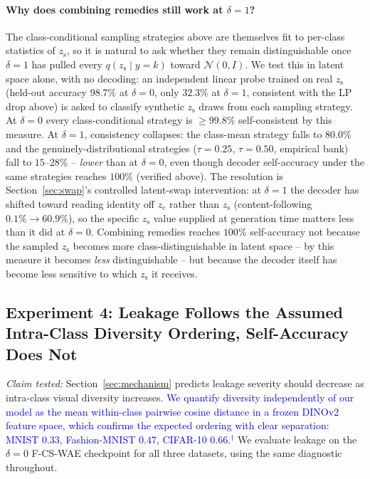 \documentclass[10pt,letterpaper]{article}
\newcommand{\ours}{F-CS-WAE}
\newcommand{\zc}{z_{\mathrm{c}}}
\newcommand{\zs}{z_{\mathrm{s}}}
\newcommand{\pj}[1]{\textcolor{blue}{#1$^{\dagger}$}}
\begin{document}
\paragraph{Why does combining remedies still work at $\delta{=}1$?} The
class-conditional sampling strategies above are themselves fit to per-class
statistics of $\zs$, so it is natural to ask whether they remain
distinguishable once $\delta{=}1$ has pulled every $q(\zs\mid y{=}k)$ toward
$\mathcal N(0,I)$. We test this in latent space alone, with no decoding: an
independent linear probe trained on real $\zs$ (held-out accuracy $98.7\%$
at $\delta{=}0$, only $32.3\%$ at $\delta{=}1$, consistent with the LP drop
above) is asked to classify synthetic $\zs$ draws from each sampling
strategy. At $\delta{=}0$ every class-conditional strategy is $\geq99.8\%$
self-consistent by this measure. At $\delta{=}1$, consistency collapses:
the class-mean strategy falls to $80.0\%$ and the genuinely-distributional
strategies ($\tau{=}0.25$, $\tau{=}0.50$, empirical bank) fall to
$15$--$28\%$ -- \emph{lower} than at $\delta{=}0$, even though decoder
self-accuracy under the same strategies reaches $100\%$ (verified above).
The resolution is Section~\ref{sec:swap}'s controlled latent-swap intervention: at
$\delta{=}1$ the decoder has shifted toward reading identity off $\zc$
rather than $\zs$ (content-following $0.1\%\to60.9\%$), so the specific
$\zs$ value supplied at generation time matters less than it did at
$\delta{=}0$. Combining remedies reaches $100\%$ self-accuracy not because
the sampled $\zs$ becomes more class-distinguishable in latent space -- by
this measure it becomes \emph{less} distinguishable -- but because the
decoder itself has become less sensitive to which $\zs$ it receives.

\subsection{Experiment 4: Leakage Follows the Assumed Intra-Class Diversity Ordering, Self-Accuracy Does Not}
\label{sec:exp4}
\label{sec:cross-dataset}

\emph{Claim tested:} Section~\ref{sec:mechanism} predicts leakage severity
should decrease as intra-class visual diversity increases. \pj{We quantify
diversity independently of our model as the mean within-class pairwise
cosine distance in a frozen DINOv2 feature space, which confirms the
expected ordering with clear separation: MNIST $0.33$, Fashion-MNIST
$0.47$, CIFAR-10 $0.66$.} We evaluate leakage on the $\delta{=}0$ \ours{}
checkpoint for all three datasets, using the same diagnostic throughout.
\end{document}
